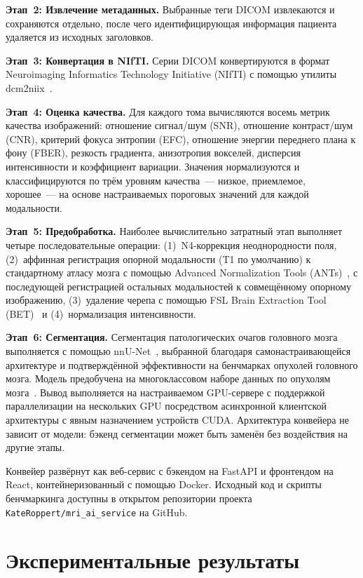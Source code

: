 \documentclass[conference]{IEEEtran}
\begin{document}
\textbf{Этап~2: Извлечение метаданных.} Выбранные теги DICOM извлекаются и сохраняются отдельно, после чего идентифицирующая информация пациента удаляется из исходных заголовков.

\textbf{Этап~3: Конвертация в NIfTI.} Серии DICOM конвертируются в формат Neuroimaging Informatics Technology Initiative (NIfTI) с помощью утилиты dcm2niix~\cite{li2016}.

\textbf{Этап~4: Оценка качества.} Для каждого тома вычисляются восемь метрик качества изображений: отношение сигнал/шум (SNR), отношение контраст/шум (CNR), критерий фокуса энтропии (EFC), отношение энергии переднего плана к фону (FBER), резкость градиента, анизотропия вокселей, дисперсия интенсивности и коэффициент вариации. Значения нормализуются и классифицируются по трём уровням качества~--- низкое, приемлемое, хорошее~--- на основе настраиваемых пороговых значений для каждой модальности.

\textbf{Этап~5: Предобработка.} Наиболее вычислительно затратный этап выполняет четыре последовательные операции: (1)~N4-коррекция неоднородности поля, (2)~аффинная регистрация опорной модальности (T1 по умолчанию) к стандартному атласу мозга с помощью Advanced Normalization Tools (ANTs)~\cite{avants2009}, с последующей регистрацией остальных модальностей к совмещённому опорному изображению, (3)~удаление черепа с помощью FSL Brain Extraction Tool (BET)~\cite{smith2002} и (4)~нормализация интенсивности.

\textbf{Этап~6: Сегментация.} Сегментация патологических очагов головного мозга выполняется с помощью nnU-Net~\cite{isensee2021}, выбранной благодаря самонастраивающейся архитектуре и подтверждённой эффективности на бенчмарках опухолей головного мозга. Модель предобучена на многоклассовом наборе данных по опухолям мозга~\cite{pnev2022}. Вывод выполняется на настраиваемом GPU-сервере с поддержкой параллелизации на нескольких GPU посредством асинхронной клиентской архитектуры с явным назначением устройств CUDA. Архитектура конвейера не зависит от модели: бэкенд сегментации может быть заменён без воздействия на другие этапы.

Конвейер развёрнут как веб-сервис с бэкендом на FastAPI и фронтендом на React, контейнеризованный с помощью Docker. Исходный код и скрипты бенчмаркинга доступны в открытом репозитории проекта \texttt{KateRoppert/mri\_ai\_service} на GitHub.

\section{Экспериментальные результаты}
\end{document}
